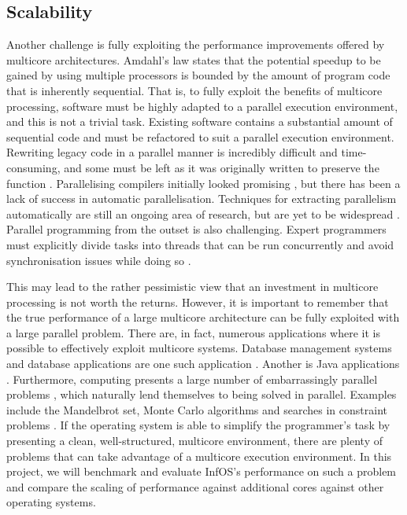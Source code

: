 \documentclass[bsc,frontabs,singlespacing,parskip,deptreport]{infthesis}
\begin{document}
\subsection{Scalability} \label{scalability-challenges}
Another challenge is fully exploiting the performance improvements offered by multicore architectures. Amdahl’s law \cite{DBLP:conf/afips/Amdahl67} \cite{DBLP:journals/computer/Amdahl13} states that the potential speedup to be gained by using multiple processors is bounded by the amount of program code that is inherently sequential. That is, to fully exploit the benefits of multicore processing, software must be highly adapted to a parallel execution environment, and this is not a trivial task. Existing software contains a substantial amount of sequential code and must be refactored to suit a parallel execution environment. Rewriting legacy code in a parallel manner is incredibly difficult and time-consuming, and some must be left as it was originally written to preserve the function \cite{geer}. Parallelising compilers initially looked promising \cite{lamport}, but there has been a lack of success in automatic parallelisation. Techniques for extracting parallelism automatically are still an ongoing area of research, but are yet to be widespread \cite{franke}. Parallel programming from the outset is also challenging. Expert programmers must explicitly divide tasks into threads that can be run concurrently and avoid synchronisation issues while doing so \cite{geer}. 

This may lead to the rather pessimistic view that an investment in multicore processing is not worth the returns. However, it is important to remember that the true performance of a large multicore architecture can be fully exploited with a large parallel problem. There are, in fact, numerous applications where it is possible to effectively exploit multicore systems. Database management systems and database applications are one such application \cite{DBLP:journals/queue/McDougall05}. Another is Java applications \cite{DBLP:journals/usenix-login/McDougallL06}. Furthermore, computing presents a large number of embarrassingly parallel problems \cite{DBLP:books/daglib/0020056}, which naturally lend themselves to being solved in parallel. Examples include the Mandelbrot set, Monte Carlo algorithms \cite{DBLP:conf/uai/NeiswangerWX14} and searches in constraint problems \cite{DBLP:journals/jair/MalapertRR16}. If the operating system is able to simplify the programmer's task by presenting a clean, well-structured, multicore environment, there are plenty of problems that can take advantage of a multicore execution environment. In this project, we will benchmark and evaluate InfOS’s performance on such a problem and compare the scaling of performance against additional cores against other operating systems.
\end{document}
